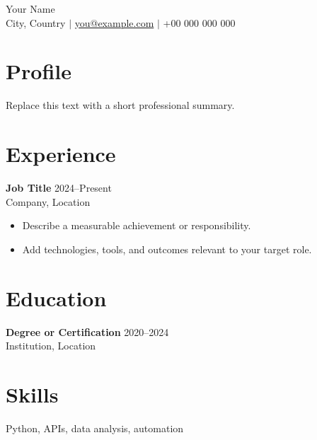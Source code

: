 \documentclass[11pt,a4paper]{article}
\begin{document}
\begin{center}
  {\LARGE Your Name}\\
  City, Country \quad $\vert$ \quad
  \href{mailto:you@example.com}{you@example.com} \quad $\vert$ \quad
  +00 000 000 000
\end{center}

\section*{Profile}
Replace this text with a short professional summary.

\section*{Experience}
\textbf{Job Title} \hfill 2024--Present\\
Company, Location
\begin{itemize}
  \item Describe a measurable achievement or responsibility.
  \item Add technologies, tools, and outcomes relevant to your target role.
\end{itemize}

\section*{Education}
\textbf{Degree or Certification} \hfill 2020--2024\\
Institution, Location

\section*{Skills}
Python, APIs, data analysis, automation
\end{document}
